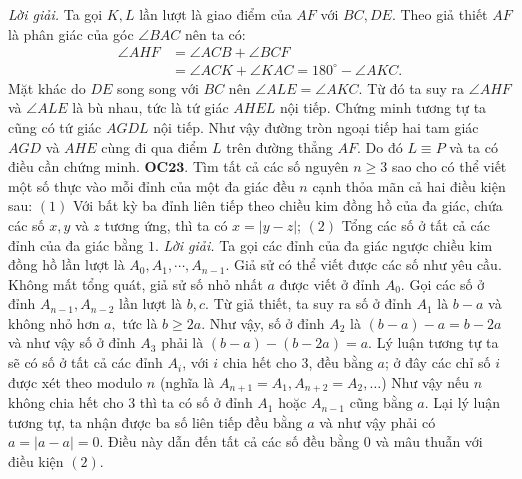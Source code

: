 \begin{multicols}{2}
\begin{figure}[H]
		\vspace*{-10pt}
	\end{figure}
	\textit{Lời giải.} 
	Ta gọi $K, L$ lần lượt là giao điểm của $AF$ với $BC, DE.$
	Theo giả thiết $AF$ là phân giác của góc $\angle BAC$ nên ta có:
	\begin{align*}
		\angle AHF&=\angle ACB \!+\! \angle BCF\\
		&= \angle ACK \!+\! \angle KAC \!=\! 180^\circ \!-\!\angle AKC.
	\end{align*}   
	Mặt khác do $DE$ song song với $BC$ nên $\angle ALE = \angle AKC.$ Từ đó ta suy ra $\angle AHF$ và $\angle ALE$ là bù nhau, tức là tứ giác $AHEL$ nội tiếp.
	\vskip 0.1cm
	Chứng minh tương tự ta cũng có tứ giác $AGDL$ nội tiếp. Như vậy đường tròn ngoại tiếp hai tam giác $AGD$ và $AHE$ cùng đi qua điểm $L$ trên đường thẳng $AF.$ Do đó $L\equiv P$ và ta có điều cần chứng minh.
	\vskip 0.1cm
	{\bf\color{cackithi} OC$\pmb{23.}$} Tìm tất cả các số nguyên $n\ge 3$ sao cho có thể viết một số
	thực vào mỗi đỉnh của một đa giác đều $n$ cạnh thỏa mãn cả hai điều kiện sau:
	\vskip 0.1cm
	$(1)$  Với bất kỳ ba đỉnh liên tiếp theo chiều kim đồng hồ của đa giác, 
	chứa các số $x, y$ và $z$ tương ứng, thì ta có $x=|y-z|$;
	\vskip 0.1cm
	$(2)$ Tổng các số ở tất cả các đỉnh của đa giác bằng $1$.
	\vskip 0.1cm
	\textit{Lời giải.} Ta gọi các đỉnh của đa giác ngược chiều kim đồng hồ lần lượt là $A_0, A_1, \cdots, A_{n-1}$. Giả sử có thể viết được các số như yêu cầu. Không mất tổng quát, giả sử số nhỏ nhất $a$ được viết ở đỉnh $A_0.$ Gọi các số ở đỉnh $A_{n-1}, A_{n-2}$ lần lượt là $b, c$. Từ giả thiết, ta suy ra số ở đỉnh $A_1$ là $b-a$ và không nhỏ hơn $a,$ tức là $b\ge 2a.$ Như vậy, số ở đỉnh $A_2$ là $(b-a)-a=b-2a$ và như vậy số ở đỉnh $A_3$ phải là $(b-a)-(b-2a)=a.$ 
	Lý luận tương tự ta sẽ có số ở tất cả các đỉnh $A_i$, với $i$ chia hết cho $3$, đều bằng $a$; ở đây các chỉ số $i$ được xét theo modulo $n$ (nghĩa là $A_{n+1}=A_1, A_{n+2}=A_2, \ldots$)  
	\vskip 0.1cm
	Như vậy nếu $n$ không chia hết cho $3$ thì ta có số ở đỉnh $A_1$ hoặc $A_{n-1}$ cũng bằng $a.$ Lại lý luận tương tự, ta nhận được ba số liên tiếp đều bằng $a$ và như vậy phải có $a=|a-a|=0.$ Điều này dẫn đến tất cả các số đều bằng $0$ và mâu thuẫn với điều kiện $(2)$.

\end{multicols}
